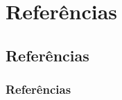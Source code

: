 \documentclass[hyphens]{beamer}
\begin{document}

\section*{Referências}
\subsection*{Referências}
{
	\renewcommand{\pgfuseimage}[1]{\scalebox{.65}{\texttt{[image: \#1]}}}
	
	\begin{frame}[allowframebreaks]
		\frametitle{Referências}
		
		{
			\scriptsize
			
		}
	\end{frame}
}
\end{document}
